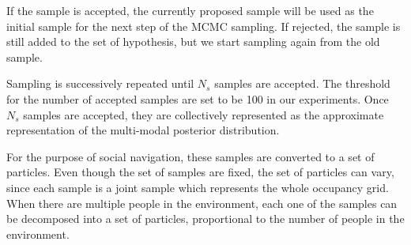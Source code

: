 If the sample is accepted, the currently proposed sample will be used as the initial sample for the next step of the MCMC sampling. If rejected, the sample is still added to the set of hypothesis, but we start sampling again from the old sample.


Sampling is successively repeated until $N_{s}$ samples are accepted. The threshold for the number of accepted samples are set to be 100 in our experiments. Once $N_{s}$ samples are accepted, they are collectively represented as the approximate representation of the multi-modal posterior distribution. 

For the purpose of social navigation, these samples are converted to a set of particles. Even though the set of samples are fixed, the set of particles can vary, since each sample is a joint sample which represents the whole occupancy grid. When there are multiple people in the environment, each one of the samples can be decomposed into a set of particles, proportional to the number of people in the environment. %